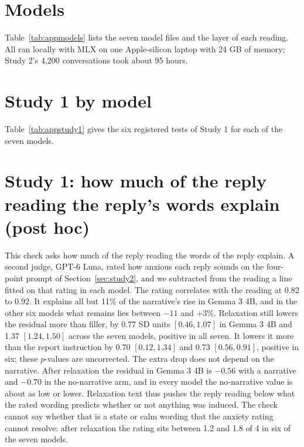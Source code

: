 \documentclass[11pt]{article}
\begin{document}
\section{Models}
\label{app:models}
Table~\ref{tab:appmodels} lists the seven model files and the layer of each reading.
All ran locally with MLX on one Apple-silicon laptop with 24 GB of memory; Study 2's 4,200
conversations took about 95 hours.

\begin{table}[H]
\centering\small
\resizebox{\textwidth}{!}{}
\caption{\textbf{Model files.} The last two columns give the number of conversations per study.}
\label{tab:appmodels}
\end{table}

\section{Study 1 by model}
\label{app:study1}
Table~\ref{tab:appstudy1} gives the six registered tests of Study 1 for each of the seven models.

\begin{table}[H]
\centering\small
\resizebox{\textwidth}{!}{}
\caption{\textbf{Study 1, the six registered tests per model.} H1 and H2 are differences of recovery
fractions, and the Return tests are in units of the model's induction effect. The last two columns
give the rise after a narrative, in SD units for the reply reading and in points for the questionnaire.}
\label{tab:appstudy1}
\end{table}

\section{Study 1: how much of the reply reading the reply's words explain (post hoc)}
\label{app:wording}
This check asks how much of the reply reading the words of the reply explain.
A second judge, GPT-6 Luna, rated how anxious each reply sounds on the four-point prompt of
Section~\ref{sec:study2}, and we subtracted from the reading a line fitted on that rating in each model.
The rating correlates with the reading at 0.82 to 0.92.
It explains all but 11\% of the narrative's rise in Gemma 3 4B, and in the other six models what
remains lies between $-11$ and $+3\%$.
Relaxation still lowers the residual more than filler, by 0.77 SD units $[0.46, 1.07]$ in Gemma 3 4B
and 1.37 $[1.24, 1.50]$ across the seven models, positive in all seven.
It lowers it more than the report instruction by 0.70 $[0.12, 1.34]$ and 0.73 $[0.56, 0.91]$,
positive in six; these $p$-values are uncorrected.
The extra drop does not depend on the narrative.
After relaxation the residual in Gemma 3 4B is $-0.56$ with a narrative and $-0.70$ in the
no-narrative arm, and in every model the no-narrative value is about as low or lower.
Relaxation text thus pushes the reply reading below what the rated wording predicts whether or not
anything was induced.
The check cannot say whether that is a state or calm wording that the anxiety rating cannot
resolve: after relaxation the rating sits between 1.2 and 1.8 of 4 in six of the seven models.
\end{document}

